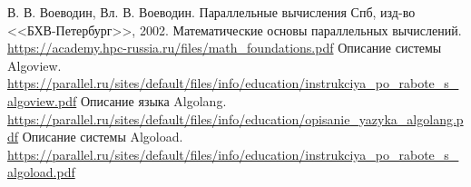 \documentclass[12pt, fleqn]{article}
\theoremstyle{definition}
\begin{document}
\newpage
\begin{thebibliography}{}
 В. В. Воеводин, Вл. В. Воеводин. Параллельные вычисления Спб, изд-во <<БХВ-Петербург>>, 2002.
 Математические основы параллельных вычислений. \\ \url{https://academy.hpc-russia.ru/files/math_foundations.pdf}
 Описание системы Algoview.\\ \url{https://parallel.ru/sites/default/files/info/education/instrukciya_po_rabote_s_algoview.pdf}
 Описание языка Algolang. \\ \url{https://parallel.ru/sites/default/files/info/education/opisanie_yazyka_algolang.pdf}
 Описание системы Algoload.\\ \url{https://parallel.ru/sites/default/files/info/education/instrukciya_po_rabote_s_algoload.pdf}
\end{thebibliography}
\end{document}
